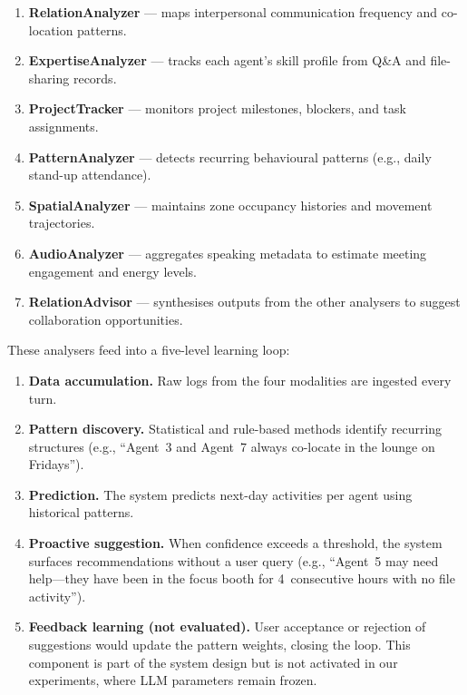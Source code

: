 \documentclass[journal]{IEEEtran}
\begin{document}
\begin{enumerate}
  \item \textbf{RelationAnalyzer} --- maps interpersonal communication
        frequency and co-location patterns.
  \item \textbf{ExpertiseAnalyzer} --- tracks each agent's skill
        profile from Q\&A and file-sharing records.
  \item \textbf{ProjectTracker} --- monitors project milestones,
        blockers, and task assignments.
  \item \textbf{PatternAnalyzer} --- detects recurring behavioural
        patterns (e.g., daily stand-up attendance).
  \item \textbf{SpatialAnalyzer} --- maintains zone occupancy
        histories and movement trajectories.
  \item \textbf{AudioAnalyzer} --- aggregates speaking metadata to
        estimate meeting engagement and energy levels.
  \item \textbf{RelationAdvisor} --- synthesises outputs from the
        other analysers to suggest collaboration opportunities.
\end{enumerate}

These analysers feed into a five-level learning loop:

\begin{enumerate}
  \item \textbf{Data accumulation.}\;
        Raw logs from the four modalities are ingested every turn.
  \item \textbf{Pattern discovery.}\;
        Statistical and rule-based methods identify recurring
        structures (e.g., ``Agent~3 and Agent~7 always co-locate in
        the lounge on Fridays'').
  \item \textbf{Prediction.}\;
        The system predicts next-day activities per agent using
        historical patterns.
  \item \textbf{Proactive suggestion.}\;
        When confidence exceeds a threshold, the system surfaces
        recommendations without a user query
        (e.g., ``Agent~5 may need help---they have been in the focus
        booth for 4~consecutive hours with no file activity'').
  \item \textbf{Feedback learning (not evaluated).}\;
        User acceptance or rejection of suggestions would update the
        pattern weights, closing the loop.  This component is part of
        the system design but is not activated in our experiments,
        where LLM parameters remain frozen.
\end{enumerate}
\end{document}
